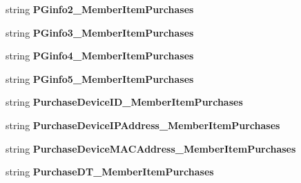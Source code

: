 \begin{DoxyCompactItemize}
\item 
string {\bfseries P\+Ginfo2\+\_\+\+Member\+Item\+Purchases}\hypertarget{a00113_ae1811655e82afb43b3f9eebaf67487a4}{}\label{a00113_ae1811655e82afb43b3f9eebaf67487a4}

\item 
string {\bfseries P\+Ginfo3\+\_\+\+Member\+Item\+Purchases}\hypertarget{a00113_a2cf78cbd22644f276b6bde3a7ca73c09}{}\label{a00113_a2cf78cbd22644f276b6bde3a7ca73c09}

\item 
string {\bfseries P\+Ginfo4\+\_\+\+Member\+Item\+Purchases}\hypertarget{a00113_a57f8d98110b9d04947bc1507a80d2feb}{}\label{a00113_a57f8d98110b9d04947bc1507a80d2feb}

\item 
string {\bfseries P\+Ginfo5\+\_\+\+Member\+Item\+Purchases}\hypertarget{a00113_ab375f1b7e663b01f0fde9c7b11f7f866}{}\label{a00113_ab375f1b7e663b01f0fde9c7b11f7f866}

\item 
string {\bfseries Purchase\+Device\+I\+D\+\_\+\+Member\+Item\+Purchases}\hypertarget{a00113_a3272cd6bf3ce12258092a0448b0cb2fe}{}\label{a00113_a3272cd6bf3ce12258092a0448b0cb2fe}

\item 
string {\bfseries Purchase\+Device\+I\+P\+Address\+\_\+\+Member\+Item\+Purchases}\hypertarget{a00113_a73e272a66ba5fa651e9213f3689f91d3}{}\label{a00113_a73e272a66ba5fa651e9213f3689f91d3}

\item 
string {\bfseries Purchase\+Device\+M\+A\+C\+Address\+\_\+\+Member\+Item\+Purchases}\hypertarget{a00113_a406f7c81a2ed6b1e015a37c30bd568cb}{}\label{a00113_a406f7c81a2ed6b1e015a37c30bd568cb}

\item 
string {\bfseries Purchase\+D\+T\+\_\+\+Member\+Item\+Purchases}\hypertarget{a00113_a5185dc4bfb92796f8e644d3ab5ea50cb}{}\label{a00113_a5185dc4bfb92796f8e644d3ab5ea50cb}


\end{DoxyCompactItemize}

